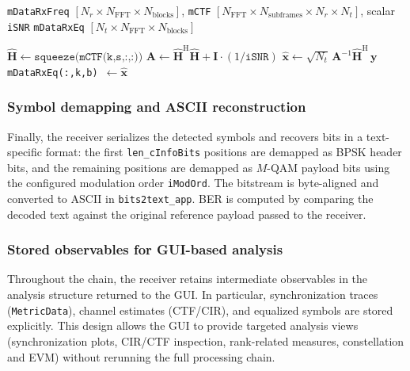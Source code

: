 \begin{algorithm}[t]
\caption{Per-subcarrier MMSE detection in spatial multiplexing (\texttt{SM\_VBLAST\_Rx\_app})}
\label{alg:mmse_loop}
\begin{algorithmic}[1]
\Require \texttt{mDataRxFreq} $[N_r \times N_{\mathrm{FFT}} \times N_{\mathrm{blocks}}]$, \texttt{mCTF} $[N_{\mathrm{FFT}} \times N_{\mathrm{subframes}} \times N_r \times N_t]$, scalar \texttt{iSNR}
\Ensure \texttt{mDataRxEq} $[N_t \times N_{\mathrm{FFT}} \times N_{\mathrm{blocks}}]$

      \State $\hat{\mathbf{H}} \leftarrow \texttt{squeeze(mCTF(k,s,:,:))}$ \Comment{$[N_r\times N_t]$}
      \State $\mathbf{A} \leftarrow \hat{\mathbf{H}}^{\mathrm{H}}\hat{\mathbf{H}} + \mathbf{I}\cdot(1/\texttt{iSNR})$
      \State $\hat{\mathbf{x}} \leftarrow \sqrt{N_t}\,\mathbf{A}^{-1}\hat{\mathbf{H}}^{\mathrm{H}}\,\mathbf{y}$ 
      \State \texttt{mDataRxEq(:,k,b) $\leftarrow \hat{\mathbf{x}}$}
    \EndFor
  \EndFor
\EndFor
\end{algorithmic}
\end{algorithm}

\subsubsection{Symbol demapping and ASCII reconstruction}
\label{sec:text_recovery_clean}

Finally, the receiver serializes the detected symbols and recovers bits in a text-specific format: the first \texttt{len\_cInfoBits} positions are demapped as BPSK header bits, and the remaining positions are demapped as $M$-QAM payload bits using the configured modulation order \texttt{iModOrd}. The bitstream is byte-aligned and converted to ASCII in \texttt{bits2text\_app}. BER is computed by comparing the decoded text against the original reference payload passed to the receiver.

\subsubsection{Stored observables for GUI-based analysis}
\label{sec:observability_clean}

Throughout the chain, the receiver retains intermediate observables in the analysis structure returned to the GUI. In particular, synchronization traces (\texttt{MetricData}), channel estimates (CTF/CIR), and equalized symbols are stored explicitly. This design allows the GUI to provide targeted analysis views (synchronization plots, CIR/CTF inspection, rank-related measures, constellation and EVM) without rerunning the full processing chain.

